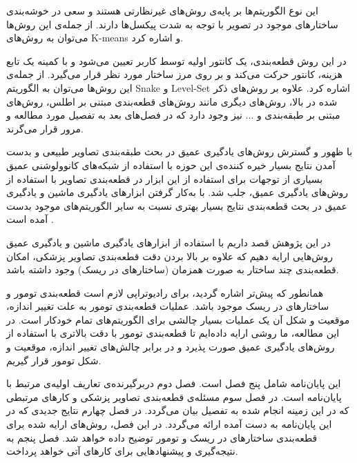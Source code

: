     این نوع الگوریتم‌ها بر پایه‌ی روش‌های غیرنظارتی هستند و سعی در خوشه‌بندی ساختارهای موجود در تصویر با توجه به شدت‌ پیکسل‌ها دارند. از جمله‌ی این روش‌ها می‌توان به روش‌های  K-means و   اشاره کرد.
  
    در این روش قطعه‌بندی، یک کانتور اولیه توسط کاربر تعیین می‌شود و با کمینه یک تابع‌ هزینه، کانتور حرکت می‌کند و بر روی مرز ساختار مورد نظر قرار می‌گیرد. از جمله‌ی این روش‌ها می‌توان به الگوریتم Snake و Level-Set اشاره کرد.
 علاوه بر روش‌های ذکر شده در بالا، روش‌های دیگری مانند روش‌های قطعه‌بندی مبتنی بر اطلس، روش‌های مبتنی بر طبقه‌بندی و ... نیز وجود دارد که در فصل‌های بعد به تفصیل مورد مطالعه و مرور قرار می‌گرند. 
 
 با ظهور و گسترش روش‌های یادگیری عمیق در بحث طبقه‌بندی تصاویر طبیعی و بدست آمدن نتایج بسیار خیره کننده‌ی این حوزه با استفاده از شبکه‌های کانوولوشنی عمیق بسیاری از توجهات برای استفاده از این ابزار در قطعه‌بندی تصاویر با استفاده از  روش‌های یادگیری عمیق، جلب شد. با به‌کار گرفتن ابزارهای یادگیری ماشین و یادگیری عمیق در بحث قطعه‌بندی نتایج بسیار بهتری نسبت به سایر الگوریتم‌های موجود بدست آمده است . 


در این پژوهش قصد داریم با استفاده از ابزارهای یادگیری ماشین و یادگیری عمیق روش‌هایی ارایه دهیم که علاوه بر بالا بردن دقت قطعه‌بندی تصاویر پزشکی، امکان قطعه‌بندی چند ساختار به صورت همزمان  (ساختارهای در ریسک) وجود داشته باشد. 

همانطور که پیش‌تر اشاره گردید، برای رادیوتراپی لازم است قطعه‌بندی تومور و ساختارهای در ریسک موجود باشد. عملیات قطعه‌بندی تومور به علت تغییر اندازه، موقعیت و شکل آن یک عملیات بسیار چالشی برای الگوریتم‌های تمام خودکار است. در این مطالعه، ما روشی ارایه داده‌ایم تا قطعه‌بندی تومور با دقت بالاتری با استفاده از روش‌های یادگیری عمیق صورت پذیرد و در برابر چالش‌های تغییر اندازه، موقعیت و شکل تومور قرار گیریم.

این پایان‌نامه شامل پنج فصل است. 
فصل دوم دربرگیرنده‌ی تعاریف اولیه‌ی مرتبط با پایان‌نامه است. 
در فصل سوم مسئله‌ی قطعه‌بندی تصاویر پزشکی و کارهای مرتبطی که در این زمینه انجام شده به تفصیل بیان می‌گردد. 
در فصل چهارم نتایج جدیدی که در این پایان‌نامه به دست آمده ارائه می‌گردد. در این فصل، روش‌های ارایه شده برای قطعه‌بندی ساختارهای در ریسک و تومور توضیح داده خواهد شد.
فصل پنجم به نتیجه‌گیری و پیشنهادهایی برای کارهای آتی خواهد پرداخت.

